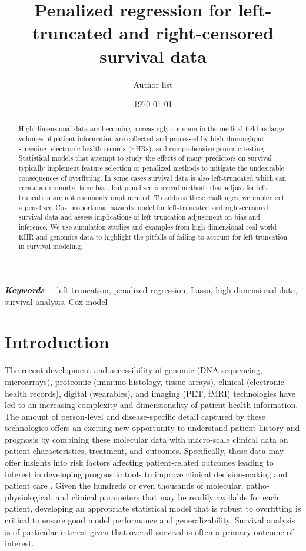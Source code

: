 \documentclass[11pt,final,fleqn]{article}\usepackage[]{graphicx}\usepackage[]{color}
\title{Penalized regression for left-truncated and right-censored survival data}
\author{Author list}
\date{\today}
\theoremstyle{plain}
\providecommand{\keywords}[1]
{
  \small	
  \textbf{\textit{Keywords---}} #1
}
\begin{document}
\maketitle

\begin{abstract}
    High-dimensional data are becoming increasingly common in the medical field as large volumes of patient information are collected and processed by high-thoroughput screening, electronic health records (EHRs), and comprehensive genomic testing. Statistical models that attempt to study the effects of many predictors on survival typically implement feature selection or penalized methods to mitigate the undesirable consequences of overfitting. In some cases survival data is also left-truncated which can create an immortal time bias, but penalized survival methods that adjust for left truncation are not commonly implemented. To address these challenges, we implement a penalized Cox proportional hazards model for left-truncated and right-censored survival data and assess implications of left truncation adjustment on bias and inference. We use simulation studies and examples from high-dimensional real-world EHR and genomics data to highlight the pitfalls of failing to account for left truncation in survival modeling.
\end{abstract}

\keywords{left truncation, penalized regression, Lasso, high-dimensional data, survival analysis, Cox model}

\section{Introduction}
The recent development and accessibility of genomic (DNA sequencing, microarrays), proteomic (immuno-histology, tissue arrays), clinical (electronic health records), digital (wearables), and imaging (PET, fMRI) technologies have led to an increasing complexity and dimensionality of patient health information. The amount of person-level and disease-specific detail captured by these technologies offers an exciting new opportunity to understand patient history and prognosis by combining these molecular data with macro-scale clinical data on patient characteristics, treatment, and outcomes. Specifically, these data may offer insights into risk factors affecting patient-related outcomes leading to interest in developing prognostic tools to improve clinical decision-making and patient care \cite{gui2005penalized, wishart2010predict, ow2016big, yousefi2017predicting}. Given the hundreds or even thousands of molecular, patho-physiological, and clinical parameters that may be readily available for each patient, developing an appropriate statistical model that is robust to overfitting is critical to ensure good model performance and generalizability. Survival analysis is of particular interest given that overall survival is often a primary outcome of interest.  
\end{document}
